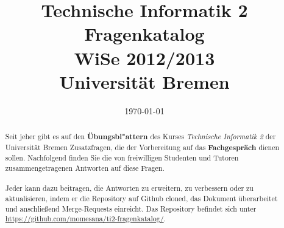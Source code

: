 \documentclass[12pt,a4paper,ngerman]{scrartcl}
\title{Technische Informatik 2 \\ Fragenkatalog \\ WiSe 2012/2013 \\[5pt] \Large{Universität Bremen}}
\date{\today}
\makeatletter
\newcommand{\question}[1]{
	\subsection[\truncate{0.80\textwidth}{#1}]{
	\textcolor{blue}{#1}}}
\newenvironment{multilinequestion}[1][]
	{\subsection[\truncate{0.80\textwidth}{#1}]{\textcolor{blue}{#1}} \color{blue}}
	{}
\newlength\RightBarWidth
\newenvironment{rightbar}
	{
	\def\FrameCommand##1{%
	\hspace{\textwidth}\hspace{-\RightBarWidth}%
	{\color{dkgreen}\vrule width \RightBarWidth}
	\hspace{-\textwidth}##1\hfill}%
	\MakeFramed{\addtolength\hsize{-\width-\RightBarWidth-\columnsep}%
	\FrameRestore}%
	}
	{\endMakeFramed}
\newcommand\mystuff@footnotebuffer{}
\newcounter{mystuff@footnote}
\newcommand\bufferfootnotes{
	\let\mystuff@footnoteold\footnote
	\setcounter{mystuff@footnote}{\thefootnote}
	\renewcommand\mystuff@footnotebuffer{}
	\renewcommand{\footnote}[1]{
		\footnotemark
		\g@addto@macro{\mystuff@footnotebuffer}{
			\stepcounter{mystuff@footnote}
			\protect\footnotetext[\themystuff@footnote]{##1}
		}
	}
}
\newcommand\stopbufferingfootnotes{%
	\mystuff@footnotebuffer%
	\renewcommand{\footnote}[1]{\mystuff@footnoteold{##1}}%
}
\newenvironment {answer}
                {\bufferfootnotes\begin{rightbar} }
                {\end{rightbar}\stopbufferingfootnotes}
\makeatother
\begin{document}
\maketitle

\begin{abstract}
Seit jeher gibt es auf den \textbf{Übungsbl"attern} des Kurses \textit{Technische Informatik 2} der Universität Bremen Zusatzfragen, die der Vorbereitung auf das \textbf{Fachgespräch} dienen sollen. Nachfolgend finden Sie die von freiwilligen Studenten und Tutoren zusammengetragenen Antworten auf diese Fragen.

\paragraph*{}
Jeder kann dazu beitragen, die Antworten zu erweitern, zu verbessern oder zu aktualisieren, indem er die Repository auf Github cloned, das Dokument überarbeitet und anschließend Merge-Requests einreicht. Das Repository befindet sich unter  \url{https://github.com/momesana/ti2-fragenkatalog/}.
\end{abstract}

\newpage

\tableofcontents 

%
%








\end{document}
